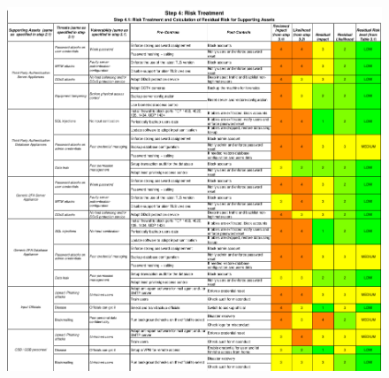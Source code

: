 \begin{figure}[b!]
    \centering
    \includegraphics[keepaspectratio,width=1\textwidth]{03-risk-analysis/005-RT/img/riskTreatCut1.pdf}
    \label{fig:riskTreatCut1}
\end{figure}

